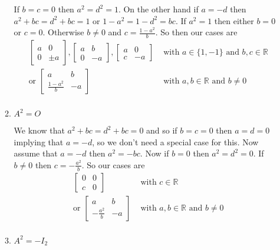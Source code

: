 \documentclass[letterpaper]{article}
\begin{document}
\begin{enumerate}
\begin{enumerate}
  If $b=c=0$ then $a^2=d^2=1$. On the other hand if $a=-d$ then $a^2+bc=d^2+bc=1$ or $1-a^2=1-d^2=bc$. If $a^2=1$ then either $b=0$ or $c=0$. Otherwise $b\ne 0$ and $c=\frac{1-a^2}{b}$. So then our cases are
  \begin{align*}
    \left[\begin{array}{cc}a&0\\0&\pm a\end{array}\right],
    \left[\begin{array}{cc}a&b\\0&-a\end{array}\right],
    \left[\begin{array}{cc}a&0\\c&-a\end{array}\right]&
    \text{ with }a\in \{1,-1\}\text{ and }b,c\in \mathbb{R}\\
    \text{or }
    \left[\begin{array}{cc}a&b\\\frac{1-a^2}{b}&-a\end{array}\right]&
    \text{ with }a,b\in \mathbb{R}\text{ and }b\ne 0\\
  \end{align*}
  \item
  $A^2=O$

  We know that $a^2+bc=d^2+bc=0$ and so if $b=c=0$ then $a=d=0$ implying that $a=-d$, so we don't need a special case for this. Now assume that $a=-d$ then $a^2=-bc$. Now if $b=0$ then $a^2=d^2=0$. If $b\ne 0$ then $c=-\frac{a^2}{b}$. So our cases are
  \begin{align*}
    \left[\begin{array}{cc}0&0\\c&0\end{array}\right]
    &\text{ with }c\in \mathbb{R}\\
    \text{or }
    \left[\begin{array}{cc}a&b\\-\frac{a^2}{b}&-a\end{array}\right]&
    \text{ with }a,b\in \mathbb{R}\text{ and }b\ne 0\\
  \end{align*}
  \item
  $A^2=-I_2$


\end{enumerate}
\end{enumerate}
\end{document}
